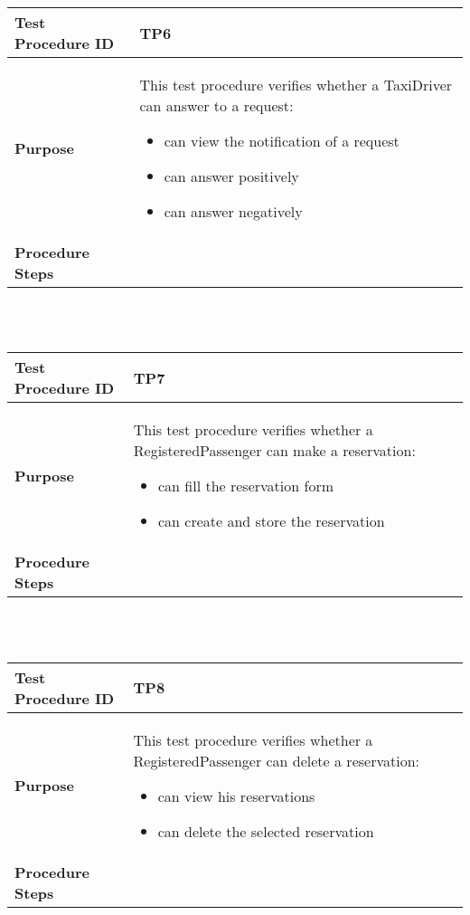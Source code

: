 			\\ \\
			\begin{tabular}{p{4cm} | p{8cm}} \hline
				\textbf{Test Procedure ID} & TP6 \\ \hline
				\textbf{Purpose} & This test procedure verifies whether a TaxiDriver can answer to a request:
				\begin{itemize}
					\item can view the notification of a request
					\item can answer positively
					\item can answer negatively
				\end{itemize}
				\\ \hline
				\textbf{Procedure Steps} &  \\ \hline
			\end{tabular}
			\\ \\
			\begin{tabular}{p{4cm} | p{8cm}} \hline
				\textbf{Test Procedure ID} & TP7 \\ \hline
				\textbf{Purpose} & This test procedure verifies whether a RegisteredPassenger can make a reservation:
				\begin{itemize}
					\item can fill the reservation form
					\item can create and store the reservation
				\end{itemize}
				\\ \hline
				\textbf{Procedure Steps} &  \\ \hline
			\end{tabular}
			\\ \\
			\begin{tabular}{p{4cm} | p{8cm}} \hline
				\textbf{Test Procedure ID} & TP8 \\ \hline
				\textbf{Purpose} & This test procedure verifies whether a RegisteredPassenger can delete a reservation:
				\begin{itemize}
					\item can view his reservations
					\item can delete the selected reservation
				\end{itemize}
				\\ \hline
				\textbf{Procedure Steps} &  \\ \hline
			\end{tabular}